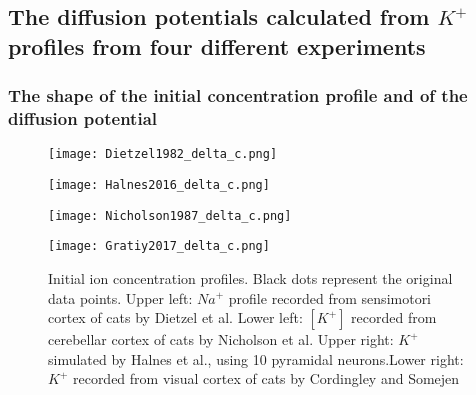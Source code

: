 \documentclass{article}
\begin{document}
\subsection{The diffusion potentials calculated from $K^+$ profiles from four different experiments}\label{diffusion potentials}
\subsubsection{The shape of the initial concentration profile and of the diffusion potential}

\begin{figure}[!tbp]
  \centering
  \begin{minipage}[b]{0.45\textwidth}
    \texttt{[image: Dietzel1982\_delta\_c.png]}
  \end{minipage}
  \hfill
  \begin{minipage}[b]{0.45\textwidth}
    \texttt{[image: Halnes2016\_delta\_c.png]}
  \end{minipage}
    \begin{minipage}[b]{0.45\textwidth}
    \texttt{[image: Nicholson1987\_delta\_c.png]}
  \end{minipage}
  \hfill
  \begin{minipage}[b]{0.45\textwidth}
    \texttt{[image: Gratiy2017\_delta\_c.png]}
  \end{minipage}
  \caption{Initial ion concentration profiles. Black dots represent the original data points. Upper left: $Na^+$ profile recorded from sensimotori cortex of cats by Dietzel et al. Lower left: $[K^+]$  recorded from cerebellar cortex of cats by Nicholson et al. Upper right:  $K^+$ simulated by Halnes et al., using 10 pyramidal neurons.Lower right: $K^+$ recorded from visual cortex of cats by Cordingley and Somejen }
  \label{fig:initial concentrations}
\end{figure} 
\end{document}
